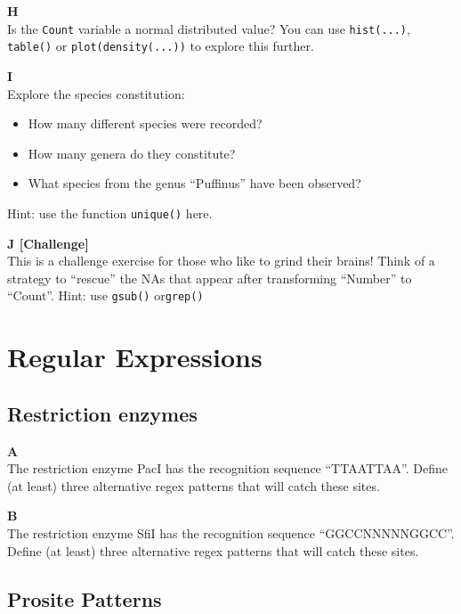 \documentclass[]{book}
\providecommand{\tightlist}{%
  \setlength{\itemsep}{0pt}\setlength{\parskip}{0pt}}
\begin{document}
\textbf{H}\\
Is the \texttt{Count} variable a normal distributed value? You can use \texttt{hist(...)}, \texttt{table()} or \texttt{plot(density(...))} to explore this further.

\textbf{I}\\
Explore the species constitution:

\begin{itemize}
\tightlist
\item
  How many different species were recorded?
\item
  How many genera do they constitute?
\item
  What species from the genus ``Puffinus'' have been observed?
\end{itemize}

Hint: use the function \texttt{unique()} here.

\textbf{J {[}Challenge{]}}\\
This is a challenge exercise for those who like to grind their brains! Think of a strategy to ``rescue'' the NAs that appear after transforming ``Number'' to ``Count''. Hint: use \texttt{gsub()} or\texttt{grep()}

\hypertarget{regular-expressions}{%
\section{Regular Expressions}\label{regular-expressions}}

\hypertarget{restriction-enzymes-1}{%
\subsection{Restriction enzymes}\label{restriction-enzymes-1}}

\textbf{A}\\
The restriction enzyme PacI has the recognition sequence ``TTAATTAA''. Define (at least) three alternative regex patterns that will catch these sites.

\textbf{B}\\
The restriction enzyme SfiI has the recognition sequence ``GGCCNNNNNGGCC''. Define (at least) three alternative regex patterns that will catch these sites.

\hypertarget{prosite-patterns-1}{%
\subsection{Prosite Patterns}\label{prosite-patterns-1}}
\end{document}
